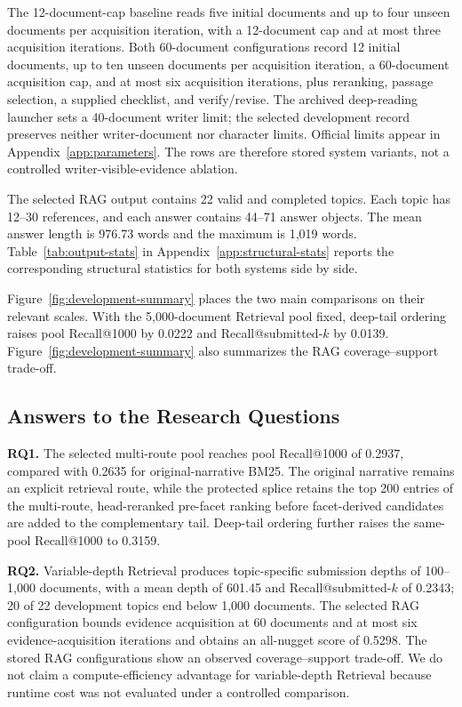 


The 12-document-cap baseline reads five initial documents and up to four
unseen documents per acquisition iteration, with a 12-document cap and
at most three acquisition iterations. Both 60-document configurations
record 12 initial documents, up to ten unseen documents per acquisition
iteration, a 60-document acquisition cap, and at most six acquisition
iterations, plus reranking, passage selection, a supplied checklist, and
verify/revise. The archived deep-reading launcher
sets a 40-document writer limit; the selected development record preserves
neither writer-document nor character limits. Official limits appear in
Appendix~\ref{app:parameters}. The rows are therefore
stored system variants, not a controlled writer-visible-evidence
ablation.

The selected RAG output contains 22 valid and completed topics. Each
topic has 12--30 references, and each answer contains 44--71 answer
objects. The mean answer length is 976.73 words and the maximum is
1,019 words. Table~\ref{tab:output-stats} in
Appendix~\ref{app:structural-stats} reports the corresponding structural
statistics for both systems side by side.

Figure~\ref{fig:development-summary} places the two main comparisons on
their relevant scales. With the 5,000-document Retrieval pool fixed,
deep-tail ordering raises pool Recall@1000 by 0.0222 and
Recall@submitted-$k$ by 0.0139. Figure~\ref{fig:development-summary}
also summarizes the RAG coverage--support trade-off.

\subsection{Answers to the Research Questions}

\textbf{RQ1.}
The selected multi-route pool reaches pool Recall@1000 of 0.2937,
compared with 0.2635 for original-narrative BM25. The original narrative
remains an explicit retrieval route, while the protected splice retains
the top 200 entries of the multi-route, head-reranked pre-facet
ranking before facet-derived candidates are added to the complementary
tail. Deep-tail ordering further raises the same-pool Recall@1000 to 0.3159.

\textbf{RQ2.}
Variable-depth Retrieval produces topic-specific submission depths of
100--1,000 documents, with a mean depth of 601.45 and
Recall@submitted-$k$ of 0.2343; 20 of 22 development topics end below
1,000 documents. The selected RAG configuration bounds evidence
acquisition at 60 documents and at most six evidence-acquisition
iterations and obtains an all-nugget score of 0.5298. The stored RAG
configurations show an observed coverage--support trade-off. We do not
claim a compute-efficiency advantage for variable-depth Retrieval because
runtime cost was not evaluated under a controlled comparison.

